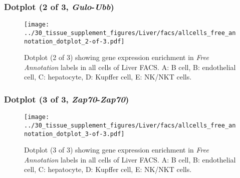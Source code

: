 \clearpage

\subsubsection{Dotplot (2 of 3, \emph{Gulo}-\emph{Ubb})}
\begin{figure}[h]
\centering
\texttt{[image: ../30\_tissue\_supplement\_figures/Liver/facs/allcells\_free\_annotation\_dotplot\_2-of-3.pdf]}

\caption{ Dotplot (2 of 3)  showing gene expression enrichment in \emph{Free Annotation} labels in all cells of Liver FACS. A: B cell, B: endothelial cell, C: hepatocyte, D: Kupffer cell, E: NK/NKT cells.}
\end{figure}


\clearpage

\subsubsection{Dotplot (3 of 3, \emph{Zap70}-\emph{Zap70})}
\begin{figure}[h]
\centering
\texttt{[image: ../30\_tissue\_supplement\_figures/Liver/facs/allcells\_free\_annotation\_dotplot\_3-of-3.pdf]}

\caption{ Dotplot (3 of 3)  showing gene expression enrichment in \emph{Free Annotation} labels in all cells of Liver FACS. A: B cell, B: endothelial cell, C: hepatocyte, D: Kupffer cell, E: NK/NKT cells.}
\end{figure}

